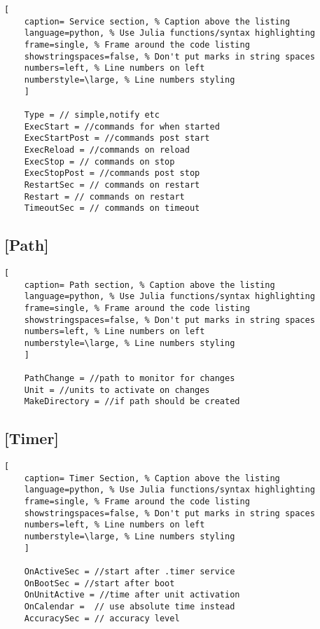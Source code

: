 \documentclass[11pt]{scrartcl} %
\begin{document}
\begin{lstlisting}[
	caption= Service section, % Caption above the listing
	language=python, % Use Julia functions/syntax highlighting
	frame=single, % Frame around the code listing
	showstringspaces=false, % Don't put marks in string spaces
	numbers=left, % Line numbers on left
	numberstyle=\large, % Line numbers styling
	]

	Type = // simple,notify etc
	ExecStart = //commands for when started
	ExecStartPost = //commands post start 
	ExecReload = //commands on reload
	ExecStop = // commands on stop
	ExecStopPost = //commands post stop
	RestartSec = // commands on restart
	Restart = // commands on restart
	TimeoutSec = // commands on timeout 

\end{lstlisting}

\subsection{[Path]}

\begin{lstlisting}[
	caption= Path section, % Caption above the listing
	language=python, % Use Julia functions/syntax highlighting
	frame=single, % Frame around the code listing
	showstringspaces=false, % Don't put marks in string spaces
	numbers=left, % Line numbers on left
	numberstyle=\large, % Line numbers styling
	]

	PathChange = //path to monitor for changes
	Unit = //units to activate on changes
	MakeDirectory = //if path should be created

\end{lstlisting}

\subsection{[Timer]}

\begin{lstlisting}[
	caption= Timer Section, % Caption above the listing
	language=python, % Use Julia functions/syntax highlighting
	frame=single, % Frame around the code listing
	showstringspaces=false, % Don't put marks in string spaces
	numbers=left, % Line numbers on left
	numberstyle=\large, % Line numbers styling
	]

	OnActiveSec = //start after .timer service
	OnBootSec = //start after boot
	OnUnitActive = //time after unit activation
	OnCalendar =  // use absolute time instead
	AccuracySec = // accuracy level
	
\end{lstlisting}
\end{document}
